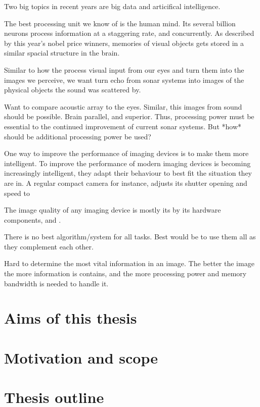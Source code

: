 Two big topics in recent years are big data and articifical intelligence. 




The best processing unit we know of is the human mind. Its several billion neurons process information at a staggering rate, and concurrently. As described by this year's nobel price winners, memories of visual objects gets stored in a similar spacial structure in the brain.  

Similar to how the process visual input from our eyes and turn them into the images we perceive, we want turn echo from sonar systems into images of the physical objects the sound was scattered by. 

Want to compare acoustic array to the eyes. Similar, this images from sound should be possible. Brain parallel, and superior. Thus, processing power must be essential to the continued improvement of current sonar systems. But *how* should be additional processing power be used?

One way to improve the performance of imaging devices is to make them more intelligent. 
To improve the performance of modern imaging devices is becoming increasingly intelligent, they adapt their behaviour to best fit the situation they are in. A regular compact camera for instance, adjusts its shutter opening and speed to 

The image quality of any imaging device is mostly its by its hardware components, and .

There is no best algorithm/system for all tasks. Best would be to use them all as they complement each other. 

Hard to determine the most vital information in an image. The better the image the more information is contains, and the more processing power and memory bandwidth is needed to handle it.



\section{Aims of this thesis}

\section{Motivation and scope}

\section{Thesis outline}

